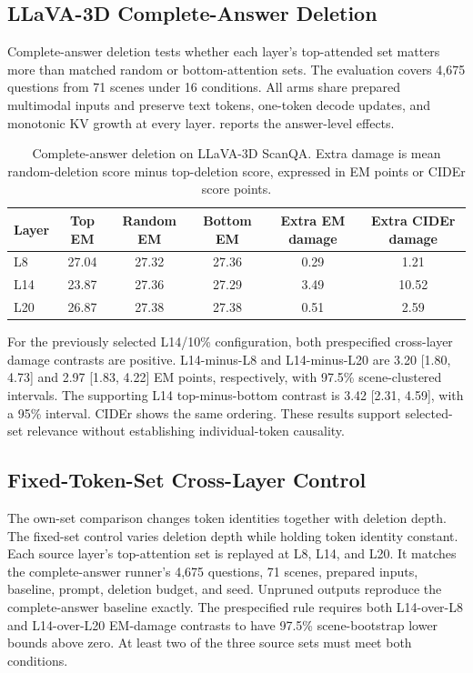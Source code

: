 \subsection{LLaVA-3D Complete-Answer Deletion}
Complete-answer deletion tests whether each layer's top-attended set matters more than matched random or bottom-attention sets. The evaluation covers 4,675 questions from 71 scenes under 16 conditions. All arms share prepared multimodal inputs and preserve text tokens, one-token decode updates, and monotonic KV growth at every layer.  reports the answer-level effects.

\begin{table}[t]
\centering
\small
\caption{Complete-answer deletion on LLaVA-3D ScanQA. Extra damage is mean random-deletion score minus top-deletion score, expressed in EM points or CIDEr score points.}
\label{tab:supp_generation}
\begin{tabular}{lccccc}
\toprule
Layer & Top EM & Random EM & Bottom EM & Extra EM damage & Extra CIDEr damage \\
\midrule
L8 & 27.04 & 27.32 & 27.36 & 0.29 & 1.21 \\
L14 & 23.87 & 27.36 & 27.29 & 3.49 & 10.52 \\
L20 & 26.87 & 27.38 & 27.38 & 0.51 & 2.59 \\
\bottomrule
\end{tabular}
\end{table}

For the previously selected L14/10\% configuration, both prespecified cross-layer damage contrasts are positive. L14-minus-L8 and L14-minus-L20 are 3.20 [1.80, 4.73] and 2.97 [1.83, 4.22] EM points, respectively, with 97.5\% scene-clustered intervals. The supporting L14 top-minus-bottom contrast is 3.42 [2.31, 4.59], with a 95\% interval. CIDEr shows the same ordering. These results support selected-set relevance without establishing individual-token causality.

\subsection{Fixed-Token-Set Cross-Layer Control}
\label{sec:supp_fixed_control}
The own-set comparison changes token identities together with deletion depth. The fixed-set control varies deletion depth while holding token identity constant. Each source layer's top-attention set is replayed at L8, L14, and L20. It matches the complete-answer runner's 4,675 questions, 71 scenes, prepared inputs, baseline, prompt, deletion budget, and seed. Unpruned outputs reproduce the complete-answer baseline exactly. The prespecified rule requires both L14-over-L8 and L14-over-L20 EM-damage contrasts to have 97.5\% scene-bootstrap lower bounds above zero. At least two of the three source sets must meet both conditions.

